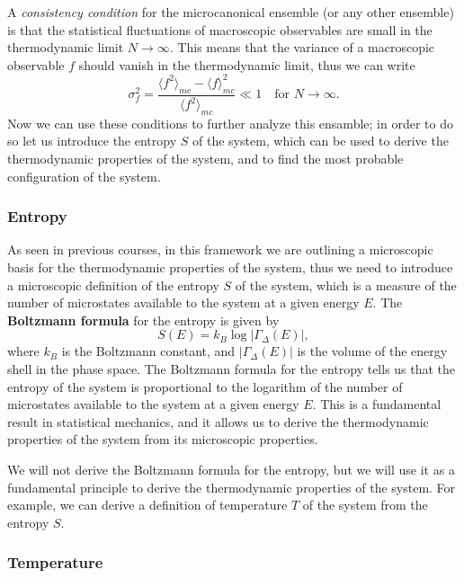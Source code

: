 A \textit{consistency condition} for the microcanonical ensemble (or any other ensemble) is that the statistical fluctuations of macroscopic observables are small in the thermodynamic limit \(N \to \infty\). This means that the variance of a macroscopic observable \(f\) should vanish in the thermodynamic limit, thus we can write
\[
    \sigma_f^2 = \frac{\langle f^2 \rangle_{mc} - \langle f \rangle_{mc}^2}{\langle f^2 \rangle_{mc}} \ll 1 \quad \text{for } N \to \infty.
\]
Now we can use these conditions to further analyze this ensamble; in order to do so let us introduce the entropy \(S\) of the system, which can be used to derive the thermodynamic properties of the system, and to find the most probable configuration of the system.

\subsubsection{Entropy}

As seen in previous courses, in this framework we are outlining a microscopic basis for the thermodynamic properties of the system, thus we need to introduce a microscopic definition of the entropy \(S\) of the system, which is a measure of the number of microstates available to the system at a given energy \(E\). The \textbf{Boltzmann formula} for the entropy is given by
\begin{equation}
    S(E) = k_B \log |\Gamma_{\Delta}(E)|,
    \label{eq:microcanonical_entropy}
\end{equation}
where \(k_B\) is the Boltzmann constant, and \(|\Gamma_{\Delta}(E)|\) is the volume of the energy shell in the phase space. The Boltzmann formula for the entropy tells us that the entropy of the system is proportional to the logarithm of the number of microstates available to the system at a given energy \(E\). This is a fundamental result in statistical mechanics, and it allows us to derive the thermodynamic properties of the system from its microscopic properties.

We will not derive the Boltzmann formula for the entropy, but we will use it as a fundamental principle to derive the thermodynamic properties of the system. For example, we can derive a definition of temperature \(T\) of the system from the entropy \(S\).

\subsubsection{Temperature}

